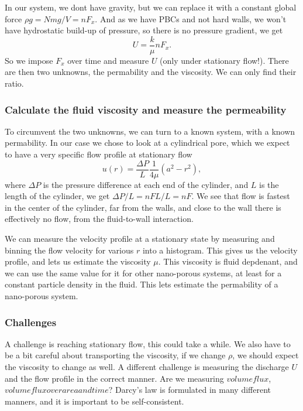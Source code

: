 \documentclass[a4paper, 11pt, notitlepage, english]{article}
\begin{document}
In our system, we dont have gravity, but we can replace it with a constant global force $\rho g = Nmg/V = nF_x$. And as we have PBCs and not hard walls, we won't have hydrostatic build-up of pressure, so there is no pressure gradient, we get
$$U = \frac{k}{\mu}nF_x.$$
So we impose $F_x$ over time and measure $U$ (only under stationary flow!). There are then two unknowns, the permability and the viscosity. We can only find their ratio.

\subsubsection*{Calculate the fluid viscosity and measure the permeability}

To circumvent the two unknowns, we can turn to a known system, with a known permability. In our case we chose to look at a cylindrical pore, which we expect to have a very specific flow profile at stationary flow
$$u(r) = \frac{\Delta P}{L} \frac{1}{4\mu} (a^2 -r^2),$$
where $\Delta P$ is the pressure difference at each end of the cylinder, and $L$ is the length of the cylinder, we get $\Delta P/L = nFL/L = nF$. We see that flow is fastest in the center of the cylinder, far from the walls, and close to the wall there is effectively no flow, from the fluid-to-wall interaction.

We can measure the velocity profile at a stationary state by measuring and binning the flow velocity for various $r$ into a histogram. This gives us the velocity profile, and lets us estimate the viscosity $\mu$. This viscosity is fluid depdenant, and we can use the same value for it for other nano-porous systems, at least for a constant particle density in the fluid. This lets estimate the permability of a nano-porous system.

\subsubsection*{Challenges}

A challenge is reaching stationary flow, this could take a while. We also have to be a bit careful about transporting the viscosity, if we change $\rho$, we should expect the viscosity to change as well. A different challenge is measuring the discharge $U$ and the flow profile in the correct manner. Are we measuring $volume flux$, $volume flux over area and time$? Darcy's law is formulated in many different manners, and it is important to be self-consistent.

\clearpage
\end{document}

